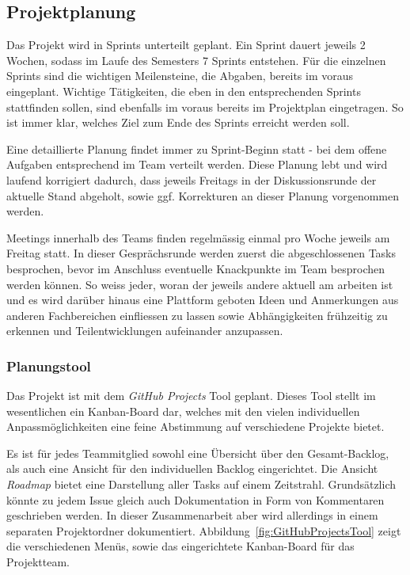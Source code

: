 \documentclass[main.tex]{subfiles} %
\begin{document}

\subsection{Projektplanung}

Das Projekt wird in Sprints unterteilt geplant. Ein Sprint dauert jeweils 2
Wochen, sodass im Laufe des Semesters 7 Sprints entstehen. Für die einzelnen
Sprints sind die wichtigen Meilensteine, die Abgaben, bereits im voraus
eingeplant. Wichtige Tätigkeiten, die eben in den entsprechenden Sprints
stattfinden sollen, sind ebenfalls im voraus bereits im Projektplan
eingetragen. So ist immer klar, welches Ziel zum Ende des Sprints erreicht
werden soll.

Eine detaillierte Planung findet immer zu Sprint-Beginn statt - bei dem offene
Aufgaben entsprechend im Team verteilt werden. Diese Planung lebt und wird
laufend korrigiert dadurch, dass jeweils Freitags in der Diskussionsrunde der
aktuelle Stand abgeholt, sowie ggf. Korrekturen an dieser Planung vorgenommen
werden.

Meetings innerhalb des Teams finden regelmässig einmal pro Woche jeweils am
Freitag statt. In dieser Gesprächsrunde werden zuerst die abgeschlossenen Tasks
besprochen, bevor im Anschluss eventuelle Knackpunkte im Team besprochen werden
können. So weiss jeder, woran der jeweils andere aktuell am arbeiten ist und es
wird darüber hinaus eine Plattform geboten Ideen und Anmerkungen aus anderen
Fachbereichen einfliessen zu lassen sowie Abhängigkeiten frühzeitig zu erkennen
und Teilentwicklungen aufeinander anzupassen. 

\subsubsection*{Planungstool}
Das Projekt ist mit dem \textit{GitHub Projects} Tool geplant. Dieses Tool stellt im wesentlichen
ein Kanban-Board dar, welches mit den vielen individuellen Anpassmöglichkeiten eine feine
Abstimmung auf verschiedene Projekte bietet.

Es ist für jedes Teammitglied sowohl eine Übersicht über den Gesamt-Backlog,
als auch eine Ansicht für den individuellen Backlog eingerichtet. Die Ansicht
\textit{Roadmap} bietet eine Darstellung aller Tasks auf einem Zeitstrahl.
Grundsätzlich könnte zu jedem Issue gleich auch Dokumentation in Form von
Kommentaren geschrieben werden. In dieser Zusammenarbeit aber wird allerdings
in einem separaten Projektordner dokumentiert.
Abbildung~\ref{fig:GitHubProjectsTool} zeigt die verschiedenen Menüs, sowie das
eingerichtete Kanban-Board für das Projektteam.
\end{document}
